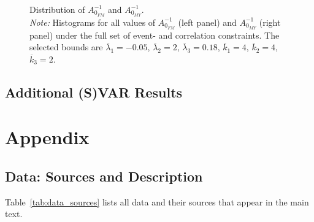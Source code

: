 \documentclass[a4paper,11pt,listof=nochaptergap,oneside,pointednumbers,bibtotoc,bigheadings,liststotoc,hidelinks]{scrbook}
\theoremstyle{mysatz}
\theoremstyle{mydefinition}
\theoremstyle{mytheorem}
\theoremstyle{mybemerkung}
\begin{document}
\begin{figure}[!h]
   \centering
   \setlength\fboxsep{0pt}
   \setlength\fboxrule{0pt}
      \caption[Distribution of $A_{0_{FM}}^{-1}$ and $A_{0_{MY}}^{-1}$.]{Distribution of $A_{0_{FM}}^{-1}$ and $A_{0_{MY}}^{-1}$.\\
      \textit{Note:} Histograms for all values of $A_{0_{FM}}^{-1}$ (left panel) and $A_{0_{MY}}^{-1}$ (right panel) under the full set of event- and correlation constraints. The selected bounds are $\overline{\lambda}_1 = -0.05$, $\overline{\lambda}_2 = 2$, $\overline{\lambda}_3 = 0.18$, $\overline{k}_1 = 4$, $\overline{k}_2 = 4$, $\overline{k}_3 = 2$.}   \label{fig:distribution_impact_matrices_type3}
\end{figure}

\section{Additional (S)VAR Results}




\chapter{Appendix}
\label{DataAndCode}
\section{Data: Sources and Description}
\label{sec:dataAppendix}
Table~\ref{tab:data_sources} lists all data and their sources that appear in the main text.
\vspace*{350px}
\end{document}
